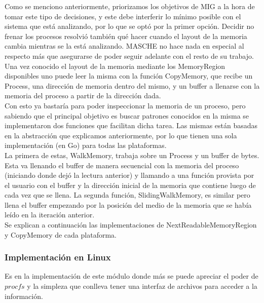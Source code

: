 \noindent Como se menciono anteriormente, priorizamos los objetivos de MIG a la
hora de tomar este tipo de decisiones, y este debe interferir lo mínimo posible
con el sistema que está analizando, por lo que se optó por la primer opción.
Decidir no frenar los procesos resolvió también qué hacer cuando el layout de
la memoria cambia mientras se la está analizando. MASCHE no hace nada en
especial al respecto más que asegurarse de poder seguir adelante con el resto
de su trabajo.\\

Una vez conocido el layout de la memoria mediante los MemoryRegion disponibles
uno puede leer la misma con la función CopyMemory, que recibe un Process, una
dirección de memoria dentro del mismo, y un buffer a llenarse con la memoria
del proceso a partir de la dirección dada.\\

Con esto ya bastaría para poder inspeccionar la memoria de un proceso, pero
sabiendo que el principal objetivo es buscar patrones conocidos en la misma
se implementaron dos funciones que facilitan dicha tarea. Las mismas están
basadas en la abstracción que explicamos anteriormente, por lo que tienen una sola
implementación (en Go) para todas las plataformas.\\

La primera de estas, WalkMemory, trabaja sobre un Process y un buffer de bytes.
Esta va llenando el buffer de manera secuencial con la memoria del proceso
(iniciando donde dejó la lectura anterior) y llamando a una función provista
por el usuario con el buffer y la dirección inicial de la memoria que contiene
luego de cada vez que se llena. La segunda función, SlidingWalkMemory, es
similar pero llena el buffer empezando por la posición del medio de la memoria
que se había leído en la iteración anterior.\\

Se explican a continuación las implementaciones de NextReadableMemoryRegion y
CopyMemory de cada plataforma.\\

\subsubsection{Implementación en Linux}

Es en la implementación de este módulo donde más se puede apreciar el poder de
$procfs$ y la simpleza que conlleva tener una interfaz de archivos para acceder a
la información.\\

